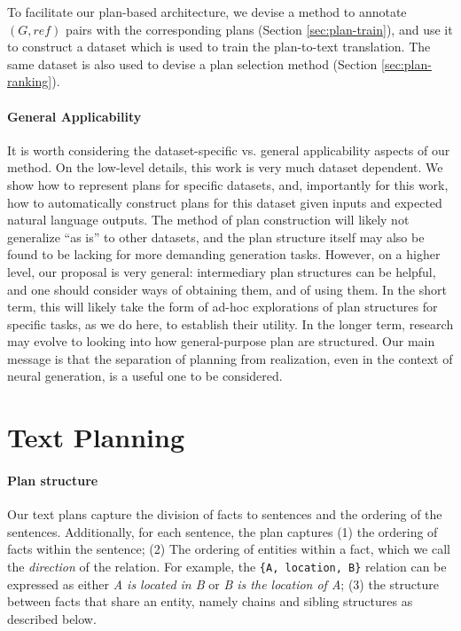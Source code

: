 \documentclass[11pt,a4paper]{article}
\begin{document}
To facilitate our plan-based architecture, we devise a method to annotate $(G, ref)$ pairs with the corresponding plans (Section \ref{sec:plan-train}), and use it to construct a dataset which is used to train the plan-to-text translation. The same dataset is also used to devise a plan selection method (Section \ref{sec:plan-ranking}).

\paragraph{General Applicability}
It is worth considering the dataset-specific vs. general applicability aspects of  our method. On the low-level details, this work is very much dataset dependent. We show how to represent plans for specific datasets, and, importantly for this work, how to automatically construct plans for this dataset given inputs and expected natural language outputs. The method of plan construction will likely not generalize ``as is'' to other datasets, and the plan structure itself may also be found to be lacking for more demanding generation tasks. However, on a higher level, our proposal is very general: intermediary plan structures can be helpful, and one should consider ways of obtaining them, and of using them. In the short term, this will likely take the form of ad-hoc explorations of plan structures for specific tasks, as we do here, to establish their utility. In the longer term, research may evolve to looking into how general-purpose plan are structured. Our main message is that the separation of planning from realization, even in the context of neural generation, is a useful one to be considered.


\section{Text Planning} \label{sec:plan-structure}

\paragraph{Plan structure}
Our text plans capture the division of facts to sentences and the ordering of the sentences. Additionally, for each sentence, the plan captures
(1) the ordering of facts within the sentence; 
(2) The ordering of entities within a fact, which we call the \emph{direction} of the relation. For example, the \texttt{\{A, location, B\}} relation can be expressed as either \emph{A is located in B} or \emph{B is the location of A}; 
(3) the structure between facts that share an entity, namely chains and sibling structures as described below.
\end{document}
